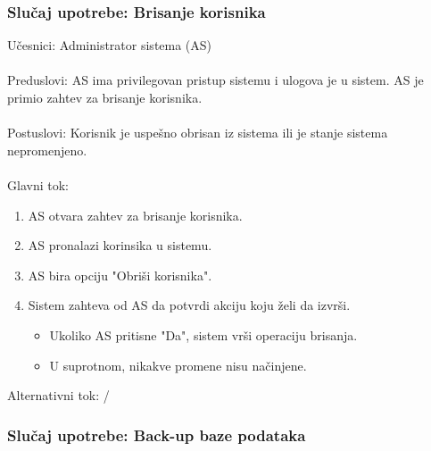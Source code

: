 \subsubsection{Slu\v caj upotrebe: Brisanje korisnika}

\label{su: brisanje korisnika}

\noindent U\v cesnici: Administrator sistema (AS)
\\
\\ Preduslovi: AS ima privilegovan pristup sistemu i ulogova je u sistem. AS je primio zahtev za brisanje korisnika.
\\
\\ Postuslovi: Korisnik je uspe\v sno obrisan iz sistema ili je stanje sistema nepromenjeno.
\\
\\ Glavni tok:
\begin{enumerate}
	\item AS otvara zahtev za brisanje korisnika.
	\item AS pronalazi korinsika u sistemu.
	\item AS bira opciju "Obri\v si korisnika".
	\item Sistem zahteva od AS da potvrdi akciju koju \v zeli da izvr\v si.
	\begin{itemize}
		\item Ukoliko AS pritisne "Da", sistem vr\v si operaciju brisanja.
		\item U suprotnom, nikakve promene nisu na\v cinjene.
	\end{itemize}
\end{enumerate}

\noindent Alternativni tok: /

\subsubsection{Slu\v caj upotrebe: Back-up baze podataka}


